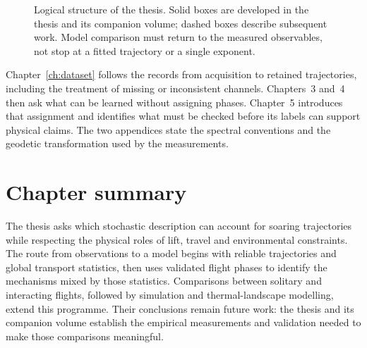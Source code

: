 \begin{figure}[H]
  \caption{Logical structure of the thesis. Solid boxes are developed in the thesis and its companion volume;
  dashed boxes describe subsequent work. Model comparison must return to the measured
  observables, not stop at a fitted trajectory or a single exponent.}
  \label{fig:thesis-structure}
\end{figure}

Chapter~\ref{ch:dataset} follows the records from acquisition to retained trajectories,
including the treatment of missing or inconsistent channels. Chapters~3
and~4 then ask what can be learned without assigning phases.
Chapter~5 introduces
that assignment and identifies what must be checked before its labels can support physical
claims. The two appendices state the spectral conventions and the geodetic
transformation used by the measurements.

\section{Chapter summary}
The thesis asks which stochastic description can account for soaring trajectories while
respecting the physical roles of lift, travel and environmental constraints. The route
from observations to a model begins with reliable trajectories and global transport
statistics, then uses validated flight phases to identify the mechanisms mixed by those
statistics. Comparisons between solitary and interacting flights, followed by simulation
and thermal-landscape modelling, extend this programme. Their conclusions remain future
work: the thesis and its companion volume establish the empirical measurements and validation needed
to make those comparisons meaningful.
